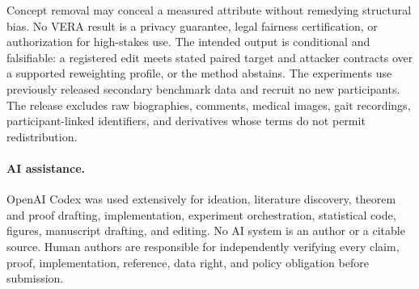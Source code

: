 Concept removal may conceal a measured attribute without remedying structural
bias. No VERA result is a privacy guarantee, legal fairness certification, or
authorization for high-stakes use. The intended output is conditional and
falsifiable: a registered edit meets stated paired target and attacker
contracts over a supported reweighting profile, or the method abstains. The
experiments use previously released secondary benchmark data and recruit no new
participants. The release excludes raw biographies, comments, medical images,
gait recordings, participant-linked identifiers, and derivatives whose terms
do not permit redistribution.

\paragraph{AI assistance.}
OpenAI Codex was used extensively for ideation, literature discovery, theorem
and proof drafting, implementation, experiment orchestration, statistical code,
figures, manuscript drafting, and editing. No AI system is an author or a
citable source. Human authors are responsible for independently verifying every
claim, proof, implementation, reference, data right, and policy obligation
before submission.
